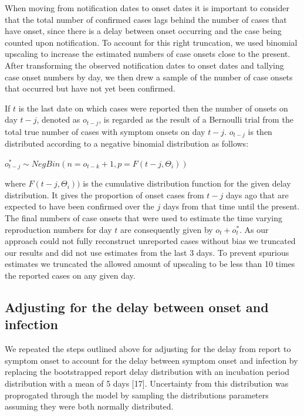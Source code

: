\documentclass[]{article}
\begin{document}
When moving from notification dates to onset dates it is important to
consider that the total number of confirmed cases lags behind the number
of cases that have onset, since there is a delay between onset occurring
and the case being counted upon notification. To account for this right
truncation, we used binomial upscaling to increase the estimated numbers
of case onsets close to the present. After transforming the observed
notification dates to onset dates and tallying case onset numbers by
day, we then drew a sample of the number of case onsets that occurred
but have not yet been confirmed.

If \(t\) is the last date on which cases were reported then the number
of onsets on day \(t-j\), denoted as \(o_{t-j}\), is regarded as the
result of a Bernoulli trial from the total true number of cases with
symptom onsets on day \(t - j\). \(o_{t-j}\) is then distributed
according to a negative binomial distribution as follows:

\(o^{*}_{t-j} \sim NegBin(n = o_{t-k} + 1, p = F(t-j, \Theta_i))\)

where \(F(t-j, \Theta_i))\) is the cumulative distribution function for
the given delay distribution. It gives the proportion of onset cases
from \(t-j\) days ago that are expected to have been confirmed over the
\(j\) days from that time until the present. The final numbers of case
onsets that were used to estimate the time varying reproduction numbers
for day \(t\) are consequently given by \(o_t + o^{*}_{t}\). As our
approach could not fully reconstruct unreported cases without bias we
truncated our results and did not use estimates from the last 3 days. To
prevent spurious estimates we truncated the allowed amount of upscaling
to be less than 10 times the reported cases on any given day.

\hypertarget{adjusting-for-the-delay-between-onset-and-infection}{%
\subsection{Adjusting for the delay between onset and
infection}\label{adjusting-for-the-delay-between-onset-and-infection}}

We repeated the steps outlined above for adjusting for the delay from
report to symptom onset to account for the delay between symptom onset
and infection by replacing the bootstrapped report delay distribution
with an incubation period distribution with a mean of 5 days {[}17{]}.
Uncertainty from this distribution was proprogated through the model by
sampling the distributions parameters assuming they were both normally
distributed.
\end{document}

